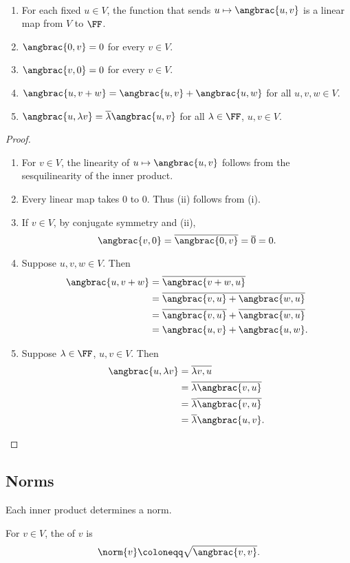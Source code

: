 \begin{lemma} \
\begin{enumerate}[label=(\roman*)]
\item For each fixed $u\in V$, the function that sends $u\mapsto\angbrac{u,v}$ is a linear map from $V$ to $\FF$.
\item $\angbrac{0,v}=0$ for every $v\in V$.
\item $\angbrac{v,0}=0$ for every $v\in V$.
\item $\angbrac{u,v+w}=\angbrac{u,v}+\angbrac{u,w}$ for all $u,v,w\in V$.
\item $\angbrac{u,\lambda v}=\overline{\lambda}\angbrac{u,v}$ for all $\lambda\in\FF$, $u,v\in V$.
\end{enumerate}
\end{lemma}

\begin{proof} \
\begin{enumerate}[label=(\roman*)]
\item For $v\in V$, the linearity of $u\mapsto\angbrac{u,v}$ follows from the sesquilinearity of the inner product.
\item Every linear map takes $0$ to $0$. Thus (ii) follows from (i).
\item If $v\in V$, by conjugate symmetry and (ii),
\[\angbrac{v,0}=\overline{\angbrac{0,v}}=\overline{0}=0.\]
\item Suppose $u,v,w\in V$. Then
\begin{align*}
\angbrac{u,v+w}
&=\overline{\angbrac{v+w,u}}\\
&=\overline{\angbrac{v,u}+\angbrac{w,u}}\\
&=\overline{\angbrac{v,u}}+\overline{\angbrac{w,u}}\\
&=\angbrac{u,v}+\angbrac{u,w}.
\end{align*}
\item Suppose $\lambda\in\FF$, $u,v\in V$. Then
\begin{align*}
\angbrac{u,\lambda v}
&=\overline{\lambda v,u}\\
&=\overline{\lambda\angbrac{v,u}}\\
&=\overline{\lambda}\overline{\angbrac{v,u}}\\
&=\overline{\lambda}\angbrac{u,v}.
\end{align*}
\end{enumerate}
\end{proof}

\subsection{Norms}
Each inner product determines a norm.
\begin{definition}[Norm]
For $v\in V$, the  of $v$ is
\[\norm{v}\coloneqq\sqrt{\angbrac{v,v}}.\]
\end{definition}

